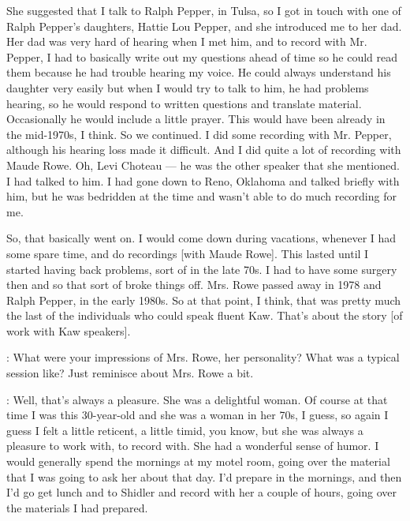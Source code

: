 \documentclass[output=paper]{LSP/langsci}
\begin{document}
She suggested that I talk to Ralph Pepper, in Tulsa, so I got in touch with one of Ralph Pepper's daughters, Hattie Lou Pepper, and she introduced me to her dad. Her dad was very hard of hearing when I met him, and to record with Mr. Pepper, I had to basically write out my questions ahead of time so he could read them because he had trouble hearing my voice. He could always understand his daughter very easily but when I would try to talk to him, he had problems hearing, so he would respond to written questions and translate material. Occasionally he would include a little prayer. This would have been already in the mid-1970s, I think. So we continued. I did some recording with Mr. Pepper, although his hearing loss made it difficult. And I did quite a lot of recording with Maude Rowe. Oh, Levi Choteau --- he was the other speaker that she mentioned. I had talked to him. I had gone down to Reno, Oklahoma and talked briefly with him, but he was bedridden at the time and wasn't able to do much recording for me.

So, that basically went on. I would come down during vacations, whenever I had some spare time, and do recordings [with Maude Rowe]. This lasted until I started having back problems, sort of in the late 70s. I had to have some surgery then and so that sort of broke things off. Mrs. Rowe passed away in 1978 and Ralph Pepper, in the early 1980s. So at that point, I think, that was pretty much the last of the individuals who could speak fluent Kaw. That's about the story [of work with Kaw speakers].

:  What were your impressions of Mrs. Rowe, her personality? What was a typical session like? Just reminisce about Mrs. Rowe a bit.

:  Well, that's always a pleasure. She was a delightful woman. Of course at that time I was this 30-year-old and she was a woman in her 70s, I guess, so again I guess I felt a little reticent, a little timid, you know, but she was always a pleasure to work with, to record with. She had a wonderful sense of humor. I would generally spend the mornings at my motel room, going over the material that I was going to ask her about that day. I'd prepare in the mornings, and then I'd go get lunch and to Shidler and record with her a couple of hours, going over the materials I had prepared. 
\end{document}
